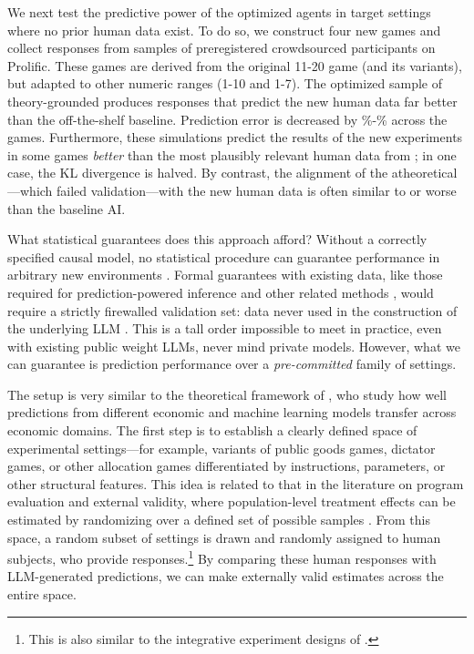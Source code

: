 We next test the predictive power of the optimized agents in target settings where no prior human data exist.
To do so, we construct four new games and collect responses from samples of preregistered crowdsourced participants \citep{horton2011online} on Prolific. 
These games are derived from the original 11-20 game (and its variants), but adapted to other numeric ranges (1-10 and 1-7).
The optimized sample of theory-grounded  produces responses that predict the new human data far better than the off-the-shelf baseline.
Prediction error is decreased by \MinPercImproveArad\%-\MaxPercImproveArad\% across the games.
Furthermore, these simulations predict the results of the new experiments in some games \emph{better} than the most plausibly relevant human data from \citeauthor{1120Arad2012}; in one case, the KL divergence is halved.
By contrast, the alignment of the atheoretical ---which failed validation---with the new human data is often similar to or worse than the baseline AI.

What statistical guarantees does this approach afford?
Without a correctly specified causal model, no statistical procedure can guarantee performance in arbitrary new environments \citep{Pearl2009Causality}.  
Formal guarantees with existing data, like those required for prediction-powered inference \citep{Angelopoulos2023Prediction} and other related methods \citep{Egami2023Using,Hardy2025Population}, would require a strictly firewalled validation set: data never used in the construction of the underlying LLM \citep{ludwig2025llmapplied,sarkar2024lookahead,ML2017Sendhil,spiess2025causaltext}.
This is a tall order impossible to meet in practice, even with existing public weight LLMs, never mind private models. 
However, what we can guarantee is prediction performance over a \emph{pre-committed} family of settings. 

The setup is very similar to the theoretical framework of \cite{andrews2025transfer}, who study how well predictions from different economic and machine learning models transfer across economic domains.
The first step is to establish a clearly defined space of experimental settings---for example, variants of public goods games, dictator games, or other allocation games differentiated by instructions, parameters, or other structural features.
This idea is related to that in the literature on program evaluation and external validity, where population-level treatment effects can be estimated by randomizing over a defined set of possible samples \citep{Hotz2005PredictingEfficacy,Allcott2015Site,Dehejia2019External}.
From this space, a random subset of settings is drawn and randomly assigned to human subjects, who provide responses.\footnote{This is also similar to the integrative experiment designs of \cite{20Q2024Almaatouq}.}
By comparing these human responses with LLM-generated predictions, we can make externally valid estimates across the entire space.

